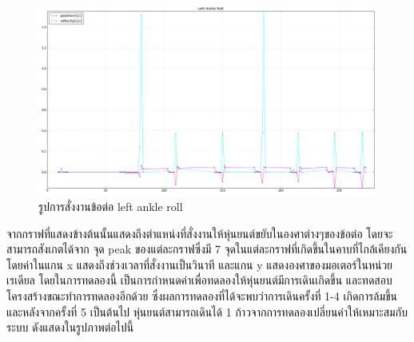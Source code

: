 \begin{figure}[!ht]
  \centering
  \includegraphics[width=1.0\linewidth]{chapter4/images/left_ankle_roll.png}
  \caption{รูปการสั่งงานข้อต่อ left ankle roll}
  \label{fig:left_ankle_roll}
\end{figure} 
\clearpage

จากกราฟที่แสดงข้างต้นนั้นแสดงถึงตำแหน่งที่สั่งงานให้หุ่นยนต์ขยับในองศาต่างๆของข้อต่อ โดยจะสามารถสังเกตได้จาก
จุด peak ของแต่ละกราฟซึ่งมี 7 จุดในแต่ละกราฟที่เกิดขึ้นในคาบที่ไกล้เคียงกัน โดยค่าในแกน x แสดงถึงช่วงเวลาที่สั่งงานเป็นวินาที 
และแกน y แสดงองศาของมอเตอร์ในหน่วยเรเดียล โดยในการทดลองนี้ เป็นการกำหนดค่าเพื่อทดลองให้หุ่นยนต์มีการเดินเกิดขึ้น
และทดสอบโครงสร้างขณะทำการทดลองอีกด้วย ซึ่งผลการทดลองที่ได้จะพบว่าการเดินครั้งที่ 1-4 เกิดการล้มขึ้น และหลังจากครั้งที่ 5 เป็นต้นไป
หุ่นยนต์สามารถเดินได้ 1 ก้าวจากการทดลองเปลี่ยนค่าให้เหมาะสมกับระบบ ดังแสดงในรูปภาพต่อไปนี้

